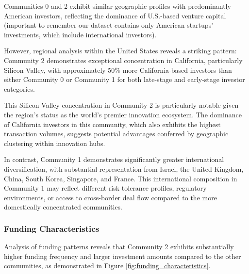 
Communities 0 and 2 exhibit similar geographic profiles with predominantly American investors, reflecting the dominance of U.S.-based venture capital (important to remember our dataset contains only American startups' investments, which include international investors). 

However, regional analysis within the United States reveals a striking pattern: Community 2 demonstrates exceptional concentration in California, particularly Silicon Valley, with approximately 50\% more California-based investors than either Community 0 or Community 1 for both late-stage and early-stage investor categories.

This Silicon Valley concentration in Community 2 is particularly notable given the region's status as the world's premier innovation ecosystem. The dominance of California investors in this community, which also exhibits the highest transaction volumes, suggests potential advantages conferred by geographic clustering within innovation hubs.


In contrast, Community 1 demonstrates significantly greater international diversification, with substantial representation from Israel, the United Kingdom, China, South Korea, Singapore, and France. This international composition in Community 1 may reflect different risk tolerance profiles, regulatory environments, or access to cross-border deal flow compared to the more domestically concentrated communities.

\subsubsection{Funding Characteristics}

Analysis of funding patterns reveals that Community 2 exhibits substantially higher funding frequency and larger investment amounts compared to the other communities, as demonstrated in Figure \ref{fig:funding_characteristics}.

